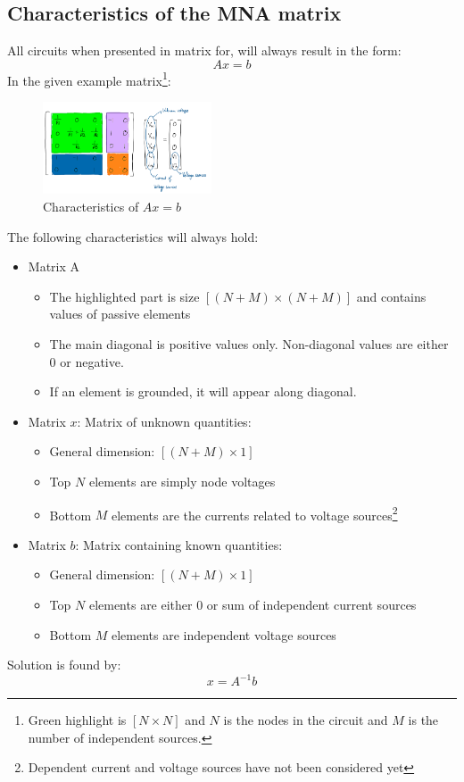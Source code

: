 \documentclass[a4paper, titlepage]{article}
\begin{document}
    \subsection{Characteristics of the MNA matrix}
    All circuits when presented in matrix for, will always result in the form:
    $$Ax = b$$
    In the given example matrix\footnote{Green highlight is $[N\times N]$
     and $N$ is the nodes in the circuit and $M$ is the number of independent sources.}:
    \begin{figure}[h]
        \centering
        \includegraphics[width=50mm,scale=1]{Highlighted matrix}
        \caption{Characteristics of $Ax = b$}
        \label{}
    \end{figure}
    \par
    The following characteristics will always hold:
    \begin{itemize}
        \item Matrix A
        \begin{itemize}
            \item The highlighted part is size $[(N+M) \times (N+M)]$ and contains values of passive elements
            \item The main diagonal is positive values only. Non-diagonal values are either 0 or negative.
            \item If an element is grounded, it will appear along diagonal. 
        \end{itemize}
        \item Matrix $x$: Matrix of unknown quantities:
        \begin{itemize}
            \item General dimension: $[(N+M)\times1]$
            \item Top $N$ elements are simply node voltages
            \item Bottom $M$ elements are the currents related to voltage sources\footnote{Dependent current and voltage sources have not been considered yet}
        \end{itemize}
        \item Matrix $b$: Matrix containing known quantities:
        \begin{itemize}
            \item General dimension: $[(N+M)\times1]$
            \item Top $N$ elements are either 0 or sum of independent current sources
            \item Bottom $M$ elements are independent voltage sources
        \end{itemize}
    \end{itemize}
    Solution is found by:
    $$x = A^{-1}b$$
    \vfill
\end{document}
